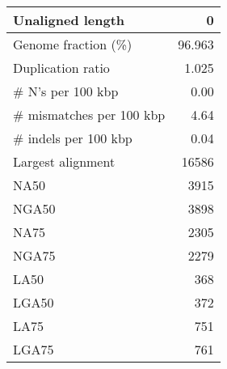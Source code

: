 \documentclass[12pt,a4paper]{article}
\begin{document}
\begin{table}[ht]
\begin{center}
\begin{tabular}{|l*{1}{|r}|}
Unaligned length & 0 \\ \hline
Genome fraction (\%) & 96.963 \\ \hline
Duplication ratio & 1.025 \\ \hline
\# N's per 100 kbp & 0.00 \\ \hline
\# mismatches per 100 kbp & 4.64 \\ \hline
\# indels per 100 kbp & 0.04 \\ \hline
Largest alignment & 16586 \\ \hline
NA50 & 3915 \\ \hline
NGA50 & 3898 \\ \hline
NA75 & 2305 \\ \hline
NGA75 & 2279 \\ \hline
LA50 & 368 \\ \hline
LGA50 & 372 \\ \hline
LA75 & 751 \\ \hline
LGA75 & 761 \\ \hline
\end{tabular}
\end{center}
\end{table}
\end{document}
